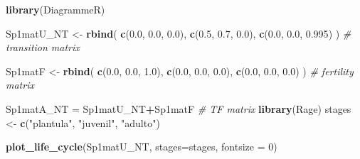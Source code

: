\documentclass[
]{book}
\newenvironment{Shaded}{\begin{snugshade}}{\end{snugshade}}
\newcommand{\AttributeTok}[1]{\textcolor[rgb]{0.13,0.29,0.53}{#1}}
\newcommand{\CommentTok}[1]{\textcolor[rgb]{0.56,0.35,0.01}{\textit{#1}}}
\newcommand{\DecValTok}[1]{\textcolor[rgb]{0.00,0.00,0.81}{#1}}
\newcommand{\FloatTok}[1]{\textcolor[rgb]{0.00,0.00,0.81}{#1}}
\newcommand{\FunctionTok}[1]{\textcolor[rgb]{0.13,0.29,0.53}{\textbf{#1}}}
\newcommand{\NormalTok}[1]{#1}
\newcommand{\OtherTok}[1]{\textcolor[rgb]{0.56,0.35,0.01}{#1}}
\newcommand{\SpecialCharTok}[1]{\textcolor[rgb]{0.81,0.36,0.00}{\textbf{#1}}}
\newcommand{\StringTok}[1]{\textcolor[rgb]{0.31,0.60,0.02}{#1}}
\theoremstyle{definition}
\theoremstyle{definition}
\theoremstyle{definition}
\theoremstyle{definition}
\theoremstyle{remark}
\begin{document}
\begin{Shaded}
\begin{Highlighting}[]
\FunctionTok{library}\NormalTok{(DiagrammeR)}

\NormalTok{Sp1matU\_NT }\OtherTok{\textless{}{-}} \FunctionTok{rbind}\NormalTok{(}
  \FunctionTok{c}\NormalTok{(}\FloatTok{0.0}\NormalTok{, }\FloatTok{0.0}\NormalTok{, }\FloatTok{0.0}\NormalTok{),}
  \FunctionTok{c}\NormalTok{(}\FloatTok{0.5}\NormalTok{, }\FloatTok{0.7}\NormalTok{, }\FloatTok{0.0}\NormalTok{),}
  \FunctionTok{c}\NormalTok{(}\FloatTok{0.0}\NormalTok{, }\FloatTok{0.0}\NormalTok{, }\FloatTok{0.995}\NormalTok{)}
\NormalTok{) }\CommentTok{\# transition matrix}

\NormalTok{Sp1matF }\OtherTok{\textless{}{-}} \FunctionTok{rbind}\NormalTok{(}
  \FunctionTok{c}\NormalTok{(}\FloatTok{0.0}\NormalTok{, }\FloatTok{0.0}\NormalTok{, }\FloatTok{1.0}\NormalTok{),}
  \FunctionTok{c}\NormalTok{(}\FloatTok{0.0}\NormalTok{, }\FloatTok{0.0}\NormalTok{, }\FloatTok{0.0}\NormalTok{),}
  \FunctionTok{c}\NormalTok{(}\FloatTok{0.0}\NormalTok{, }\FloatTok{0.0}\NormalTok{, }\FloatTok{0.0}\NormalTok{)}
\NormalTok{) }\CommentTok{\# fertility matrix}

\NormalTok{Sp1matA\_NT }\OtherTok{=}\NormalTok{ Sp1matU\_NT}\SpecialCharTok{+}\NormalTok{Sp1matF }\CommentTok{\# TF matrix}
\FunctionTok{library}\NormalTok{(Rage)}
\NormalTok{stages }\OtherTok{\textless{}{-}} \FunctionTok{c}\NormalTok{(}\StringTok{"plantula"}\NormalTok{, }\StringTok{"juvenil"}\NormalTok{, }\StringTok{"adulto"}\NormalTok{)}

\FunctionTok{plot\_life\_cycle}\NormalTok{(Sp1matU\_NT, }\AttributeTok{stages=}\NormalTok{stages, }\AttributeTok{fontsize =} \DecValTok{0}\NormalTok{)}
\end{Highlighting}
\end{Shaded}
\end{document}
